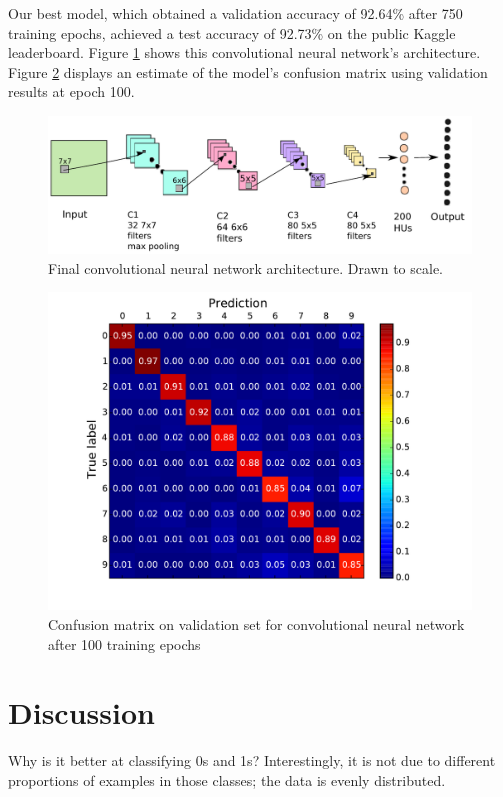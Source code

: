 \documentclass{acm_proc_article-sp}
\begin{document}
Our best model, which obtained a validation accuracy of 92.64\% after 750 training epochs, achieved a test accuracy of 92.73\% on the public Kaggle leaderboard. Figure \ref{fig:convnet-architect} shows this convolutional neural network's architecture. Figure \ref{fig:convnet-confusion} displays an estimate of the model's confusion matrix using validation results at epoch 100.

 \begin{figure}[t]
	\centering
	\includegraphics[width=\linewidth]{architecture.pdf}
  	\caption{Final convolutional neural network architecture. Drawn to scale.}
  	\label{fig:convnet-architect}
\end{figure}

\begin{figure}[h!]
	\centering
	\includegraphics[width=\linewidth]{convnet_confusion.pdf}
  	\caption{Confusion matrix on validation set for convolutional neural network after 100 training epochs}
  	\label{fig:convnet-confusion}
\end{figure}


\section{Discussion}%
Why is it better at classifying 0s and 1s? Interestingly, it is not due to different proportions of examples in those classes; the data is evenly distributed.
\end{document}
